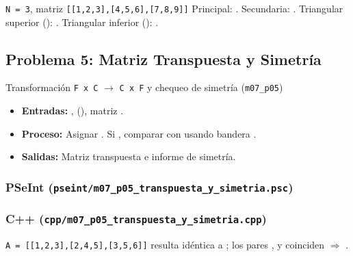 \documentclass[11pt,letterpaper]{article}
\begin{document}
\begin{pruebaescritorio}{\texttt{N = 3}, matriz \texttt{[[1,2,3],[4,5,6],[7,8,9]]}}
Principal: . Secundaria: . Triangular superior (): . Triangular inferior (): .
\end{pruebaescritorio}

\subsection{Problema 5: Matriz Transpuesta y Simetría}
\begin{analisis}{Transformación \texttt{F x C} $\rightarrow$ \texttt{C x F} y chequeo de simetría (\texttt{m07\_p05})}
\begin{itemize}
  \item \textbf{Entradas:} ,  (), matriz .
  \item \textbf{Proceso:} Asignar . Si , comparar  con  usando bandera .
  \item \textbf{Salidas:} Matriz transpuesta  e informe de simetría.
\end{itemize}
\end{analisis}

\subsubsection*{PSeInt (\texttt{pseint/m07\_p05\_transpuesta\_y\_simetria.psc})}


\subsubsection*{C++ (\texttt{cpp/m07\_p05\_transpuesta\_y\_simetria.cpp})}


\begin{pruebaescritorio}{\texttt{A = [[1,2,3],[2,4,5],[3,5,6]]}}
 resulta idéntica a ; los pares ,  y  coinciden $\Rightarrow$ .
\end{pruebaescritorio}
\end{document}
